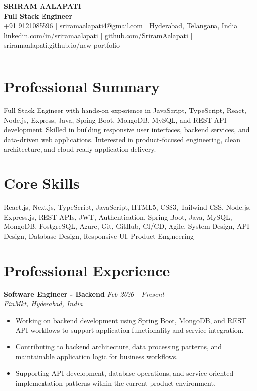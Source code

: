 \documentclass[10pt,a4paper]{article}
\begin{document}
\begin{center}
  {\LARGE \textbf{SRIRAM AALAPATI}}\\[0.3em]
  {\large \textcolor{accent}{\textbf{Full Stack Engineer}}}\\[0.4em]
  \small
  +91 9121085596 \quad | \quad sriramaalapati4@gmail.com \quad | \quad Hyderabad, Telangana, India\\
  linkedin.com/in/sriramaalapati \quad | \quad github.com/SriramAalapati \quad | \quad sriramaalapati.github.io/new-portfolio
\end{center}

\vspace{0.15cm}
\noindent\textcolor{accent}{\rule{\linewidth}{0.8pt}}

\section*{\textcolor{accent}{Professional Summary}}
Full Stack Engineer with hands-on experience in JavaScript, TypeScript, React, Node.js, Express, Java, Spring Boot, MongoDB, MySQL, and REST API development. Skilled in building responsive user interfaces, backend services, and data-driven web applications. Interested in product-focused engineering, clean architecture, and cloud-ready application delivery.

\section*{\textcolor{accent}{Core Skills}}
\small
React.js, Next.js, TypeScript, JavaScript, HTML5, CSS3, Tailwind CSS, Node.js, Express.js, REST APIs, JWT, Authentication, Spring Boot, Java, MySQL, MongoDB, PostgreSQL, Azure, Git, GitHub, CI/CD, Agile, System Design, API Design, Database Design, Responsive UI, Product Engineering

\section*{\textcolor{accent}{Professional Experience}}

\textbf{Software Engineer - Backend} \hfill \textit{Feb 2026 - Present}\\
\textit{FinMkt, Hyderabad, India}\\
\begin{itemize}
  \item Working on backend development using Spring Boot, MongoDB, and REST API workflows to support application functionality and service integration.
  \item Contributing to backend architecture, data processing patterns, and maintainable application logic for business workflows.
  \item Supporting API development, database operations, and service-oriented implementation patterns within the current product environment.
\end{itemize}
\end{document}
